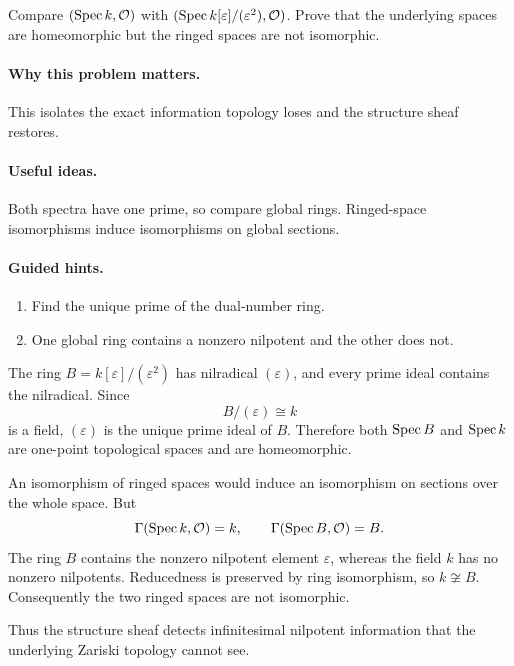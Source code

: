 \begin{problem}\label{prob:vi17-p08}
Compare $(\operatorname{Spec} k,\mathcal O)$ with $(\operatorname{Spec} k[\varepsilon]/(\varepsilon^2),\mathcal O)$.  Prove that the underlying spaces are homeomorphic but the ringed spaces are not isomorphic.
\end{problem}

\ifdefined\FullProblemDossiers
\paragraph{Why this problem matters.}
This isolates the exact information topology loses and the structure sheaf restores.

\paragraph{Useful ideas.}
Both spectra have one prime, so compare global rings.  Ringed-space isomorphisms induce isomorphisms on global sections.

\paragraph{Guided hints.}
\begin{enumerate}
\item Find the unique prime of the dual-number ring.
\item One global ring contains a nonzero nilpotent and the other does not.
\end{enumerate}

\begin{solution}
The ring $B=k[\varepsilon]/(\varepsilon^2)$ has nilradical $(\varepsilon)$, and every prime ideal contains the nilradical.  Since
\[
B/(\varepsilon)\cong k
\]
is a field, $(\varepsilon)$ is the unique prime ideal of $B$.  Therefore both $\operatorname{Spec} B$ and $\operatorname{Spec} k$ are one-point topological spaces and are homeomorphic.

An isomorphism of ringed spaces would induce an isomorphism on sections over the whole space.  But
\[
\Gamma(\operatorname{Spec} k,\mathcal O)=k,
\qquad
\Gamma(\operatorname{Spec} B,\mathcal O)=B.
\]
The ring $B$ contains the nonzero nilpotent element $\varepsilon$, whereas the field $k$ has no nonzero nilpotents.  Reducedness is preserved by ring isomorphism, so $k\not\cong B$.  Consequently the two ringed spaces are not isomorphic.

Thus the structure sheaf detects infinitesimal nilpotent information that the underlying Zariski topology cannot see.
\end{solution}



